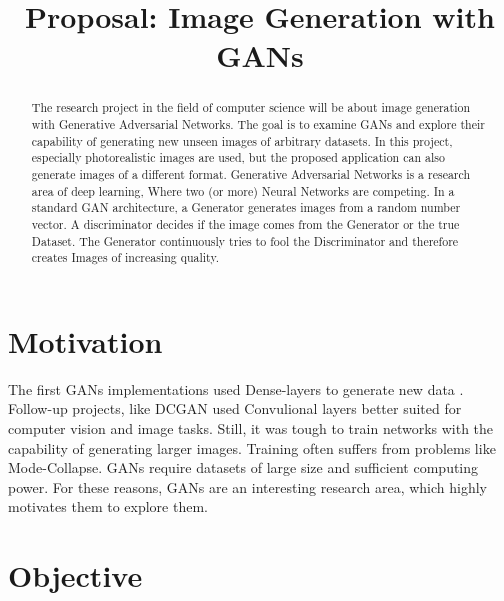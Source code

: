 \documentclass[conference,onecolumn,compsoc]{IEEEtran}
\begin{document}
\title{Proposal: Image Generation with GANs}

\author{
}
\maketitle

\begin{abstract}

\noindent
The research project in the field of computer science will be about image generation with Generative Adversarial Networks. The goal is to examine GANs and explore their capability of generating new unseen images of arbitrary datasets. In this project, especially photorealistic images are used, but the proposed application can also generate images of a different format. Generative Adversarial Networks is a research area of deep learning, Where two (or more) Neural Networks are competing. In a standard GAN architecture, a Generator generates images from a random number vector. A discriminator decides if the image comes from the Generator or the true Dataset. The Generator continuously tries to fool the Discriminator and therefore creates Images of increasing quality.

\end{abstract}


\section{Motivation}

\noindent
The first GANs implementations used Dense-layers to generate new data \cite{goodfellow2014generative}. Follow-up projects, like DCGAN \cite{radford2016unsupervised} used Convulional layers better suited for computer vision and image tasks. Still, it was tough to train networks with the capability of generating larger images. Training often suffers from problems like Mode-Collapse. GANs require datasets of large size and sufficient computing power. For these reasons, GANs are an interesting research area, which highly motivates them to explore them.

\section{Objective}
\end{document}
